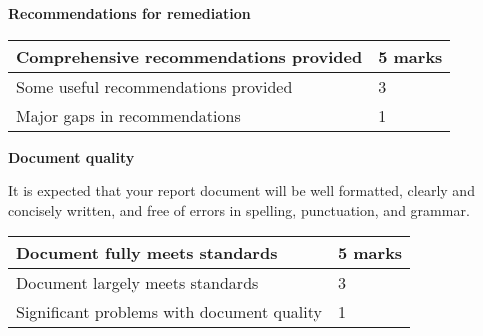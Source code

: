 \documentclass{article}
\begin{document}
\textbf{Recommendations for remediation}

\begin{tabular}{|l|l|} 
	\hline
	Comprehensive recommendations provided                     & 5  marks \\ \hline
	Some useful recommendations provided                       & 3 \\ \hline
	Major gaps in recommendations         		               & 1 \\  \hline	
\end{tabular}

\textbf{Document quality} 

It is expected that your report document will be well formatted, clearly and concisely written, and free of errors in spelling, punctuation, and grammar.

\begin{tabular}{|l|l|} 
	\hline
	Document fully meets standards                         & 5  marks \\ \hline
	Document largely meets standards                       & 3 \\ \hline
	Significant problems with document quality         	   & 1 \\  \hline	
\end{tabular}
\end{document}
